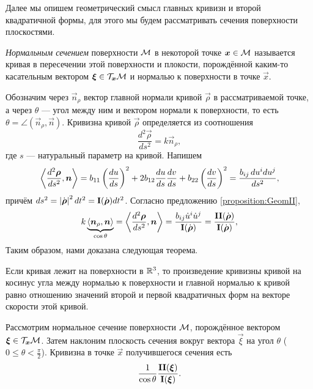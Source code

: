 Далее мы опишем геометрический смысл главных кривизн и второй квадратичной формы, для этого мы будем рассматривать сечения поверхности плоскостями. 

\begin{definition}
	\textit{Нормальным сечением} поверхности $\mathcal{M}$ в некоторой точке $\boldsymbol{x} \in \mathcal{M}$ называется кривая в пересечении этой поверхности и плокости, порождённой каким-то касательным вектором $\boldsymbol{\xi} \in \mathcal{T}_{\boldsymbol{x}}\mathcal{M}$ и нормалью к поверхности в точке $\vec{x}$.
\end{definition}

 Обозначим через $\vec{n}_\rho$ вектор главной нормали кривой $\vec{\rho}$ в рассматриваемой точке, а через $\theta$ --- угол между ним и вектором нормали к поверхности, то есть $\theta = \angle(\vec{n}_\rho, \vec{n})$. Кривизна\footnotemark{} кривой $\vec{\rho}$ определяется из соотношения
\[
	\frac{d^2\vec{\rho}}{ds^2} = k\vec{n}_\rho,
\]
где $s$ --- натуральный параметр на кривой. Напишем
\[
	\left\langle\frac{d^2\boldsymbol{\rho}}{ds^2}, \boldsymbol{n}\right\rangle = b_{11}\left(\frac{du}{ds}\right)^2 + 2b_{12}\frac{du}{ds}\frac{dv}{ds} + b_{22}\left(\frac{dv}{ds}\right)^2 = \frac{b_{ij}\,du^idu^j}{ds^2},
\]
причём $ds^2 = \left\lvert\dot{\boldsymbol{\rho}}\right\rvert^2dt^2 = \boldsymbol{\operatorname{I}}(\dot{\boldsymbol{\rho}})dt^2$. Согласно предложению \ref{proposition:GeomII},
\[
	k\underbrace{\langle\boldsymbol{n}_\rho, \boldsymbol{n}\rangle}_{\cos\theta} = \left\langle\frac{d^2\boldsymbol{\rho}}{ds^2}, \boldsymbol{n}\right\rangle = \frac{b_{ij}\dot{u}^i\dot{u}^j}{\boldsymbol{\operatorname{I}}(\dot{\boldsymbol{\rho}})} = \frac{\boldsymbol{\operatorname{II}}(\dot{\boldsymbol{\rho}})}{\boldsymbol{\operatorname{I}}(\dot{\boldsymbol{\rho}})},
\]
Таким образом, нами доказана следующая теорема.


\begin{theorem}
	Если кривая лежит на поверхности в $\mathbb{R}^3$, то произведение кривизны кривой на косинус угла между нормалью к поверхности и главной нормалью к кривой равно отношению значений второй и первой квадратичных форм на векторе скорости этой кривой.
\end{theorem}

\begin{corollary} \label{theorem:Meusneir}
	Рассмотрим нормальное сечение поверхности $\mathcal{M}$, порождённое вектором $\boldsymbol{\xi} \in \mathcal{T}_{\boldsymbol{x}}\mathcal{M}$. Затем наклоним плоскость сечения вокруг вектора $\vec{\xi}$ на угол $\theta$ ($0 \leqslant \theta < \frac{\pi}{2}$). Кривизна в точке $\vec{x}$ получившегося сечения есть
	\[
		\frac{1}{\cos\theta}\frac{\boldsymbol{\operatorname{II}}(\boldsymbol{\xi})}{\boldsymbol{\operatorname{I}}(\boldsymbol{\xi})}.
	\]
\end{corollary}

